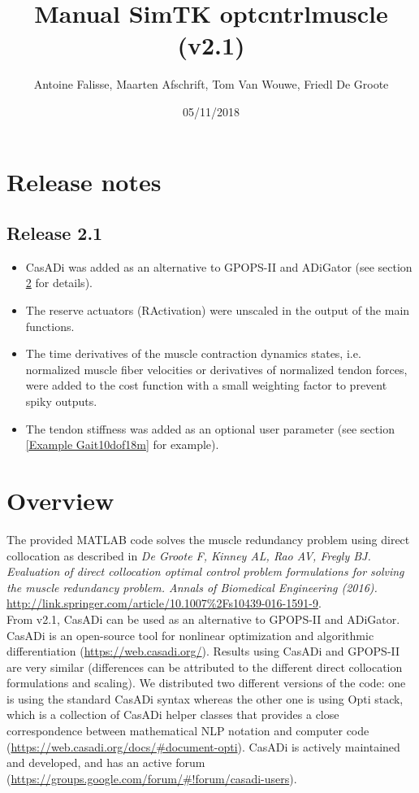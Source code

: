 \documentclass[a4paper,oneside,11pt]{article}
\begin{document}
\title{Manual SimTK optcntrlmuscle (v2.1)}
\author{Antoine Falisse, Maarten Afschrift, Tom Van Wouwe, Friedl De Groote}
\date{05/11/2018} 
\maketitle
\tableofcontents

\section{Release notes}

\subsection{Release 2.1}
\begin{itemize}
	\item CasADi was added as an alternative to GPOPS-II and ADiGator (see section \ref{Overview} for details).
	\item The reserve actuators (RActivation) were unscaled in the output of the main functions.
	\item The time derivatives of the muscle contraction dynamics states, i.e. normalized muscle fiber velocities or derivatives of normalized tendon forces, were added to the cost function with a small weighting factor to prevent spiky outputs.
	 \item The tendon stiffness was added as an optional user parameter (see section \ref{Example Gait10dof18m} for example).
\end{itemize}


\section{Overview}
\label{Overview}

The provided MATLAB code solves the muscle redundancy problem using direct collocation  as described in \textit{De Groote F, Kinney AL, Rao AV, Fregly BJ. Evaluation of direct collocation optimal control problem formulations for solving the muscle redundancy problem. Annals of Biomedical Engineering (2016).} \url{http://link.springer.com/article/10.1007%2Fs10439-016-1591-9}. 
\\

From v2.1, CasADi can be used as an alternative to GPOPS-II and ADiGator. CasADi is an open-source tool for nonlinear optimization and algorithmic differentiation (\url{https://web.casadi.org/}). Results using CasADi and GPOPS-II are very similar (differences can be attributed to the different direct collocation formulations and scaling). We distributed two different versions of the code: one is using the standard CasADi syntax whereas the other one is using Opti stack, which is a collection of CasADi helper classes that provides a close correspondence between mathematical NLP notation and computer code (\url{https://web.casadi.org/docs/#document-opti}). CasADi is actively maintained and developed, and  has an active forum (\url{https://groups.google.com/forum/#!forum/casadi-users}). \\
\end{document}
